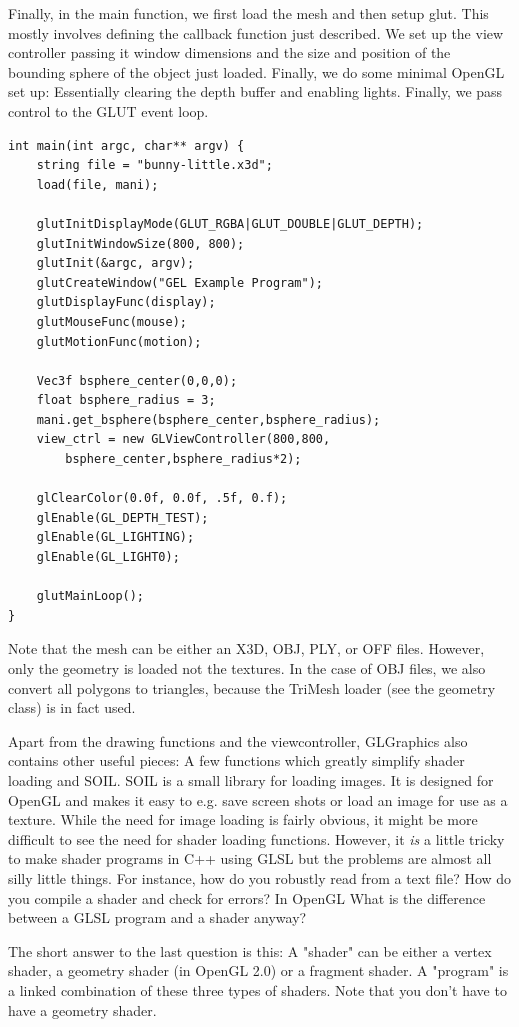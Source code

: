 \documentclass[a4paper]{article}
\begin{document}
Finally, in the main function, we first load the mesh and then setup glut. This mostly involves defining the callback function just described. We set up the view controller passing it window dimensions and the size and position of the bounding sphere of the object just loaded. Finally, we do some minimal OpenGL set up: Essentially clearing the depth buffer and enabling lights. Finally, we pass control to the GLUT event loop.
\begin{verbatim}
int main(int argc, char** argv) {
    string file = "bunny-little.x3d";
    load(file, mani);

    glutInitDisplayMode(GLUT_RGBA|GLUT_DOUBLE|GLUT_DEPTH);
    glutInitWindowSize(800, 800);
    glutInit(&argc, argv);
    glutCreateWindow("GEL Example Program");
    glutDisplayFunc(display);
    glutMouseFunc(mouse);
    glutMotionFunc(motion);
    
    Vec3f bsphere_center(0,0,0);   
    float bsphere_radius = 3;
    mani.get_bsphere(bsphere_center,bsphere_radius);
    view_ctrl = new GLViewController(800,800, 
        bsphere_center,bsphere_radius*2);
    
    glClearColor(0.0f, 0.0f, .5f, 0.f);
    glEnable(GL_DEPTH_TEST);
    glEnable(GL_LIGHTING);
    glEnable(GL_LIGHT0);
    
    glutMainLoop();
}
\end{verbatim}
Note that the mesh can be either an X3D, OBJ, PLY, or OFF files. However, only the geometry is loaded not the textures. In the case of OBJ files, we also convert all polygons to triangles, because the TriMesh loader (see the geometry class) is in fact used.

Apart from the drawing functions and the viewcontroller, GLGraphics also contains  other useful pieces: A few functions which greatly simplify shader loading and SOIL. SOIL is a small library for loading images. It is designed for OpenGL and makes it easy to e.g. save screen shots or load an image for use as a texture. While the need for image loading is fairly obvious, it might be more difficult to see the need for shader loading functions. However, it \textit{is} a little tricky to make shader programs in C++ using GLSL but the problems are almost all silly little things. For instance, how do you robustly read from a text file? How do you compile a shader and check for errors? In OpenGL What is the difference between a GLSL program and a shader anyway?

The short answer to the last question is this: A "shader" can be either a vertex shader, a geometry shader (in OpenGL 2.0) or a fragment shader. A "program" is a linked combination of these three types of shaders. Note that you don't have to have a geometry shader.
\end{document}
